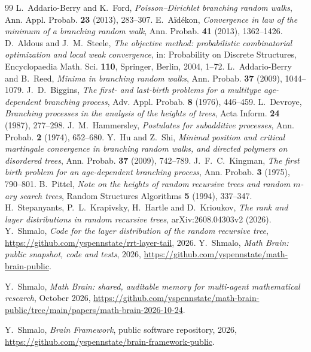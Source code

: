 \documentclass[11pt]{amsart}
\theoremstyle{definition}
\theoremstyle{remark}
\numberwithin{equation}{section}
\begin{document}
\begin{thebibliography}{99}
 L.~Addario-Berry and K.~Ford, \emph{Poisson--Dirichlet branching random walks}, Ann. Appl. Probab. \textbf{23} (2013), 283--307.
 E.~A\"id\'ekon, \emph{Convergence in law of the minimum of a branching random walk}, Ann. Probab. \textbf{41} (2013), 1362--1426.
 D.~Aldous and J.~M.~Steele, \emph{The objective method: probabilistic combinatorial optimization and local weak convergence}, in: Probability on Discrete Structures, Encyclopaedia Math. Sci. \textbf{110}, Springer, Berlin, 2004, 1--72.
 L.~Addario-Berry and B.~Reed, \emph{Minima in branching random walks}, Ann. Probab. \textbf{37} (2009), 1044--1079.
 J.~D.~Biggins, \emph{The first- and last-birth problems for a multitype age-dependent branching process}, Adv. Appl. Probab. \textbf{8} (1976), 446--459.
 L.~Devroye, \emph{Branching processes in the analysis of the heights of trees}, Acta Inform. \textbf{24} (1987), 277--298.
 J.~M.~Hammersley, \emph{Postulates for subadditive processes}, Ann. Probab. \textbf{2} (1974), 652--680.
 Y.~Hu and Z.~Shi, \emph{Minimal position and critical martingale convergence in branching random walks, and directed polymers on disordered trees}, Ann. Probab. \textbf{37} (2009), 742--789.
 J.~F.~C.~Kingman, \emph{The first birth problem for an age-dependent branching process}, Ann. Probab. \textbf{3} (1975), 790--801.
 B.~Pittel, \emph{Note on the heights of random recursive trees and random $m$-ary search trees}, Random Structures Algorithms \textbf{5} (1994), 337--347.
 H.~Stepanyants, P.~L.~Krapivsky, H.~Hartle and D.~Krioukov, \emph{The rank and layer distributions in random recursive trees}, arXiv:2608.04303v2 (2026).
 Y.~Shmalo, \emph{Code for the layer distribution of the random recursive tree}, \url{https://github.com/yspennstate/rrt-layer-tail}, 2026.
 Y.~Shmalo, \emph{Math Brain: public snapshot, code and tests}, 2026, \url{https://github.com/yspennstate/math-brain-public}.

 Y.~Shmalo, \emph{Math Brain: shared, auditable memory for multi-agent mathematical research}, October 2026, \url{https://github.com/yspennstate/math-brain-public/tree/main/papers/math-brain-2026-10-24}.

 Y.~Shmalo, \emph{Brain Framework}, public software repository, 2026, \url{https://github.com/yspennstate/brain-framework-public}.

\end{thebibliography}
\end{document}
